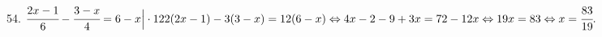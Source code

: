 54. $\cfrac{2x-1}{6}-\cfrac{3-x}{4}=6-x\Big|\cdot12
2(2x-1)-3(3-x)=12(6-x)\Leftrightarrow 4x-2-9+3x=72-12x\Leftrightarrow19x=83 \Leftrightarrow x=\cfrac{83}{19}.$\\

